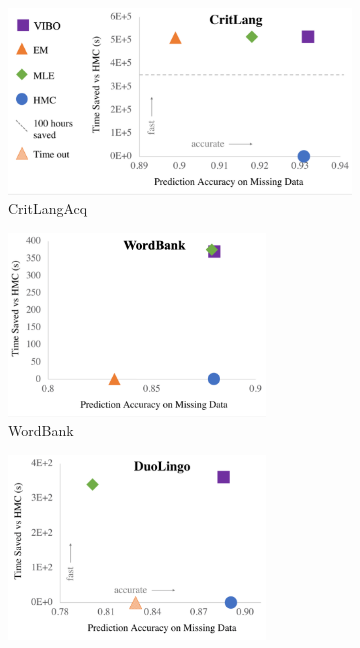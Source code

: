 \begin{figure}
    \begin{subfigure}[b]{0.5\textwidth}
        \centering
        \includegraphics[width=\textwidth]{images/chapter7/excel/critlangacq.png}
        \caption{CritLangAcq}
    \end{subfigure}
    \begin{subfigure}[b]{0.5\textwidth}
        \centering
        \includegraphics[width=0.75\textwidth]{images/chapter7/excel/wordbank.png}
        \caption{WordBank}
    \end{subfigure}
    \begin{subfigure}[b]{0.5\textwidth}
        \centering
        \includegraphics[width=0.75\textwidth]{images/chapter7/excel/duolingo.png}

\end{subfigure}
\end{figure}
